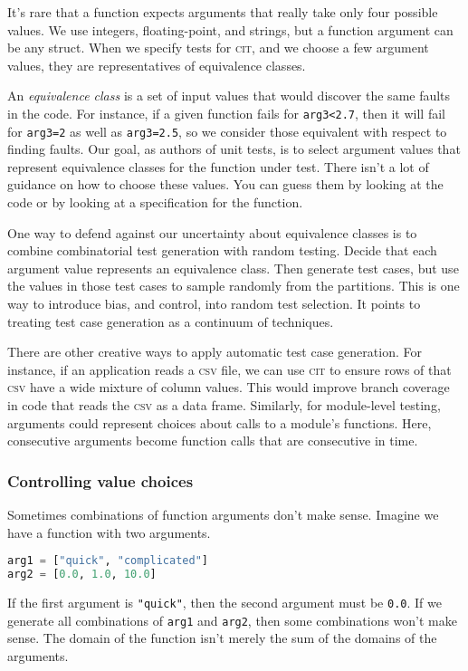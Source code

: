 \documentclass{juliacon}
\newcommand{\cit}{\textsc{cit}\xspace}
\newcommand{\csv}{\textsc{csv}\xspace}
\begin{document}
\vskip 6pt
It's rare that a function expects arguments that really take only four possible values. We use integers, floating-point, and strings, but a function argument can be any struct. When we specify tests for \cit, and we choose a few argument values, they are representatives of equivalence classes.

\vskip 6pt
An \emph{equivalence class} is a set of input values that would discover the same faults in the code. For instance, if a given function fails for \verb|arg3<2.7|, then it will fail for \verb|arg3=2| as well as \verb|arg3=2.5|, so we consider those equivalent with respect to finding faults. Our goal, as authors of unit tests, is to select argument values that represent equivalence classes for the function under test. There isn't a lot of guidance on how to choose these values. You can guess them by looking at the code or by looking at a specification for the function.

\vskip 6pt
One way to defend against our uncertainty about equivalence classes is to combine combinatorial test generation with random testing. Decide that each argument value represents an equivalence class. Then generate test cases, but use the values in those test cases to sample randomly from the partitions. This is one way to introduce bias, and control, into random test selection. It points to treating test case generation as a continuum of techniques.

\vskip 6pt
There are other creative ways to apply automatic test case generation. For instance, if an application reads a \csv file, we can use \cit to ensure rows of that \csv have a wide mixture of column values. This would improve branch coverage in code that reads the \csv as a data frame. Similarly, for module-level testing, arguments could represent choices about calls to a module's functions. Here, consecutive arguments become function calls that are consecutive in time.


\subsubsection{Controlling value choices}

Sometimes combinations of function arguments don't make sense. Imagine we have a function with two arguments.
\begin{lstlisting}[language=Julia]
arg1 = ["quick", "complicated"]
arg2 = [0.0, 1.0, 10.0]
\end{lstlisting}
If the first argument is \verb|"quick"|, then the second argument must be \verb|0.0|. If we generate all combinations of \verb|arg1| and \verb|arg2|, then some combinations won't make sense. The domain of the function isn't merely the sum of the domains of the arguments.
\end{document}

